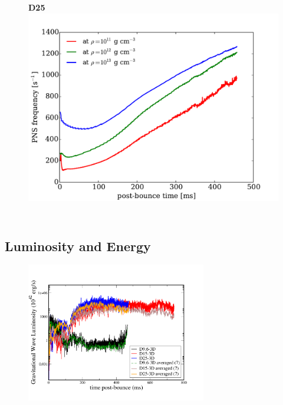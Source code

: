 \documentclass[aspectratio=169]{beamer}
\begin{document}
\begin{frame}
\begin{columns}[c]
      \begin{figure}
        \textbf{D25}
        \includegraphics[width=1.0\textwidth]{Figures/D25_peakFrequency.pdf}
      \end{figure}

  \end{columns}

\end{frame}

\subsection{Luminosity and Energy}

\begin{frame}

  \begin{figure}
    \includegraphics[width=0.7\textwidth]{Figures/Luminosity.pdf}
  \end{figure}

\end{frame}
\end{document}
